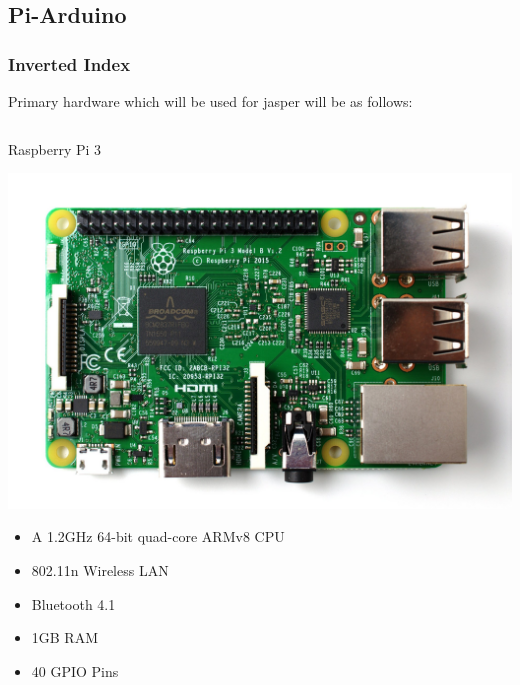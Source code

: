 \documentclass[xcolor=dvipsnames]{beamer}
\begin{document}
\subsection{Pi-Arduino}
\begin{frame}[fragile]
\frametitle{Inverted Index}
Primary hardware which will be used for jasper will be as follows:

\begin{columns}[c]
\begin{exampleblock}{\small{Raspberry Pi 3}}
\begin{center}
\includegraphics[scale=0.03]{images/pi3.jpg}\\
\begin{itemize}
\item A 1.2GHz 64-bit quad-core ARMv8 CPU
\item 802.11n Wireless LAN
\item Bluetooth 4.1
\item 1GB RAM
\item 40 GPIO Pins
\end{itemize}
\end{center}
\end{exampleblock}


\end{columns}
\end{frame}
\end{document}
